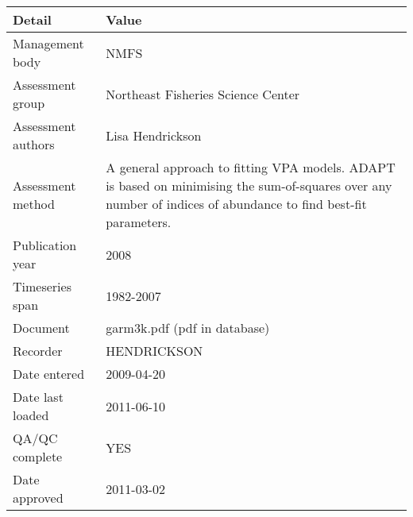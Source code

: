 \begin{table}[htb]
\centering
\begin{tabular}{lp{7cm}}
\toprule
Detail & Value \\
\midrule
Management body    & NMFS                                                                                                                                                           \\
Assessment group   & Northeast Fisheries Science Center                                                                                                                             \\
Assessment authors & Lisa Hendrickson                                                                                                                                               \\
Assessment method  & A general approach to fitting VPA models. ADAPT is based on minimising the sum-of-squares over any number of indices of abundance to find best-fit parameters. \\
Publication year   & 2008                                                                                                                                                           \\
Timeseries span    & 1982-2007                                                                                                                                                      \\
Document           & garm3k.pdf (pdf in database)                                                                                                                                   \\
Recorder           & HENDRICKSON                                                                                                                                                    \\
Date entered       & 2009-04-20                                                                                                                                                     \\
Date last loaded   & 2011-06-10                                                                                                                                                     \\
QA/QC complete     & YES                                                                                                                                                            \\
Date approved      & 2011-03-02                                                                                                                                                     \\
\bottomrule
\end{tabular}
\label{tab:assessdet}
\end{table}

